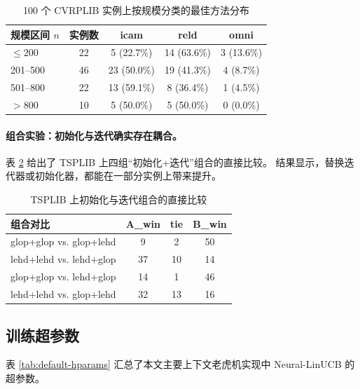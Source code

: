 \begin{table}[htb]
  \centering
  \caption{100 个 CVRPLIB 实例上按规模分类的最佳方法分布}
  \label{tab:motivation-cvrp-by-size}
  \small
  \begin{tabular}{lcccc}
    \toprule
    规模区间 $n$ & 实例数 & icam & reld & omni \\
    \midrule
    $\leq 200$ & 22 & 5 (22.7\%)  & 14 (63.6\%) & 3 (13.6\%) \\
    201--500   & 46 & 23 (50.0\%) & 19 (41.3\%) & 4 (8.7\%)  \\
    501--800   & 22 & 13 (59.1\%) & 8 (36.4\%)  & 1 (4.5\%)  \\
    $> 800$    & 10 & 5 (50.0\%)  & 5 (50.0\%)  & 0 (0.0\%)  \\
    \bottomrule
  \end{tabular}
\end{table}

\paragraph{组合实验：初始化与迭代确实存在耦合。}
表 \ref{tab:motivation-composition} 给出了 TSPLIB 上四组“初始化+迭代”组合的直接比较。
结果显示，替换迭代器或初始化器，都能在一部分实例上带来提升。

\begin{table}[htb]
  \centering
  \caption{TSPLIB 上初始化与迭代组合的直接比较}
  \label{tab:motivation-composition}
  \small
  \begin{tabular}{lccc}
    \toprule
    组合对比 & A\_win & tie & B\_win \\
    \midrule
    glop+glop vs. glop+lehd & 9  & 2  & 50 \\
    lehd+lehd vs. lehd+glop & 37 & 10 & 14 \\
    glop+glop vs. lehd+glop & 14 & 1  & 46 \\
    lehd+lehd vs. glop+lehd & 32 & 13 & 16 \\
    \bottomrule
  \end{tabular}
\end{table}

\subsection{训练超参数}

表 \ref{tab:default-hparams} 汇总了本文主要上下文老虎机实现中 Neural-LinUCB 的超参数。

